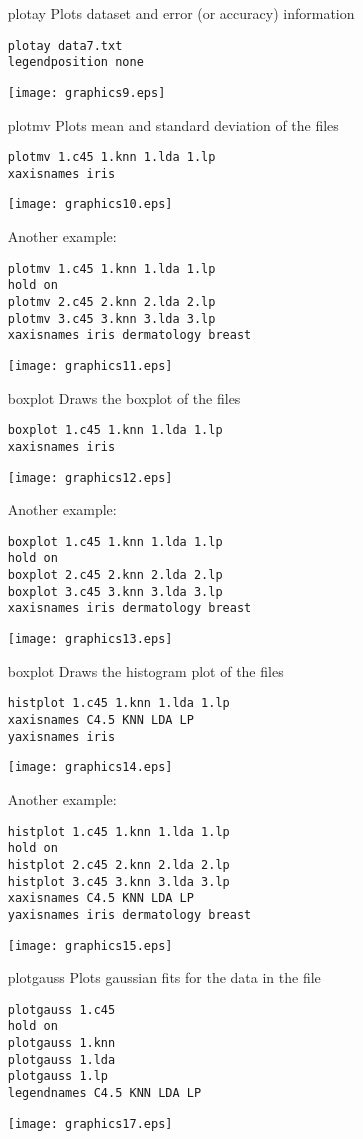 \documentclass[a4paper,12pt]{book}
\begin{document}
\begin{itemize}
\item[plotay] Plots dataset and error (or accuracy) information
\begin{verbatim}
plotay data7.txt
legendposition none
\end{verbatim}
\texttt{[image: graphics9.eps]}

\item[plotmv] Plots mean and standard deviation of the files
\begin{verbatim}
plotmv 1.c45 1.knn 1.lda 1.lp
xaxisnames iris
\end{verbatim}
\texttt{[image: graphics10.eps]}

Another example:
\begin{verbatim}
plotmv 1.c45 1.knn 1.lda 1.lp
hold on
plotmv 2.c45 2.knn 2.lda 2.lp
plotmv 3.c45 3.knn 3.lda 3.lp
xaxisnames iris dermatology breast
\end{verbatim}
\texttt{[image: graphics11.eps]}

\item[boxplot] Draws the boxplot of the files
\begin{verbatim}
boxplot 1.c45 1.knn 1.lda 1.lp
xaxisnames iris
\end{verbatim}
\texttt{[image: graphics12.eps]}

Another example:
\begin{verbatim}
boxplot 1.c45 1.knn 1.lda 1.lp
hold on
boxplot 2.c45 2.knn 2.lda 2.lp
boxplot 3.c45 3.knn 3.lda 3.lp
xaxisnames iris dermatology breast
\end{verbatim}
\texttt{[image: graphics13.eps]}

\item[boxplot] Draws the histogram plot of the files
\begin{verbatim}
histplot 1.c45 1.knn 1.lda 1.lp
xaxisnames C4.5 KNN LDA LP
yaxisnames iris
\end{verbatim}
\texttt{[image: graphics14.eps]}

Another example:
\begin{verbatim}
histplot 1.c45 1.knn 1.lda 1.lp
hold on
histplot 2.c45 2.knn 2.lda 2.lp
histplot 3.c45 3.knn 3.lda 3.lp
xaxisnames C4.5 KNN LDA LP
yaxisnames iris dermatology breast
\end{verbatim}
\texttt{[image: graphics15.eps]}

\item[plotgauss] Plots gaussian fits for the data in the file
\begin{verbatim}
plotgauss 1.c45
hold on
plotgauss 1.knn
plotgauss 1.lda
plotgauss 1.lp
legendnames C4.5 KNN LDA LP
\end{verbatim}
\texttt{[image: graphics17.eps]}

\end{itemize}



\end{document}
